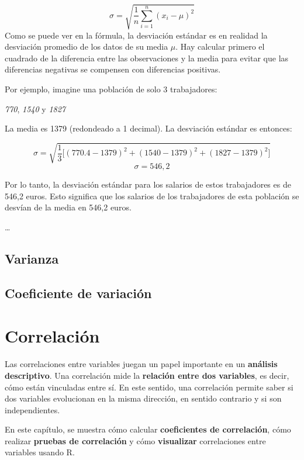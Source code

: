 \documentclass[
]{book}
\begin{document}
\[\sigma = \sqrt{\frac{1}{n}\sum^n_{i = 1}(x_i - \mu)^2}\]
Como se puede ver en la fórmula, la desviación estándar es en realidad la desviación promedio de los datos de su media \(\mu\). Hay calcular primero el cuadrado de la diferencia entre las observaciones y la media para evitar que las diferencias negativas se compensen con diferencias positivas.

Por ejemplo, imagine una población de solo 3 trabajadores:

\emph{770}, \emph{1540} y \emph{1827}

La media es 1379 (redondeado a 1 decimal). La desviación estándar es entonces:

\[\sigma = \sqrt{\frac{1}{3}\big[(770.4 - 1379)^2 + (1540 - 1379)^2 + (1827 - 1379)^2 \big]}\]
\[\sigma = 546,2\]

Por lo tanto, la desviación estándar para los salarios de estos trabajadores es de 546,2 euros. Esto significa que los salarios de los trabajadores de esta población se desvían de la media en 546,2 euros.

\ldots{}

\hypertarget{varianza}{%
\subsection{Varianza}\label{varianza}}

\hypertarget{coeficiente-de-variaciuxf3n}{%
\subsection{Coeficiente de variación}\label{coeficiente-de-variaciuxf3n}}

\hypertarget{correlaciuxf3n}{%
\section{Correlación}\label{correlaciuxf3n}}

Las correlaciones entre variables juegan un papel importante en un \textbf{análisis descriptivo}. Una correlación mide la \textbf{relación entre dos variables}, es decir, cómo están vinculadas entre sí. En este sentido, una correlación permite saber si dos variables evolucionan en la misma dirección, en sentido contrario y si son independientes.

En este capítulo, se muestra cómo calcular \textbf{coeficientes de correlación}, cómo realizar \textbf{pruebas de correlación} y cómo \textbf{visualizar} correlaciones entre variables usando R.
\end{document}
